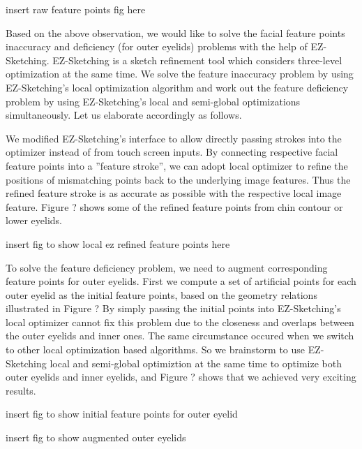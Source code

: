 		\begin{center}
				insert raw feature points fig here
		\end{center}
		
		Based on the above observation, we would like to solve the facial feature points inaccuracy and deficiency (for outer eyelids) problems with the help of EZ-Sketching. EZ-Sketching is a sketch refinement tool which considers three-level optimization at the same time. We solve the feature inaccuracy problem by using EZ-Sketching's local optimization algorithm and work out the feature deficiency problem by using EZ-Sketching's local and semi-global optimizations simultaneously. Let us elaborate accordingly as follows.
		
		We modified EZ-Sketching's interface to allow directly passing strokes into the optimizer instead of from touch screen inputs. By connecting respective facial feature points into a ''feature stroke'', we can adopt local optimizer to refine the positions of mismatching points back to the underlying image features. Thus the refined feature stroke is as accurate as possible with the respective local image feature. Figure ? shows some of the refined feature points from chin contour or lower eyelids.
		
		\begin{center}
				insert fig to show local ez refined feature points here
		\end{center}
		
		To solve the feature deficiency problem, we need to augment corresponding feature points for outer eyelids. First we compute a set of artificial points for each outer eyelid as the initial feature points, based on the geometry relations illustrated in Figure ? By simply passing the initial points into EZ-Sketching's local optimizer cannot fix this problem due to the closeness and overlaps between the outer eyelids and inner ones. The same circumstance occured when we switch to other local optimization based algorithms. So we brainstorm to use EZ-Sketching local and semi-global optimiztion at the same time to optimize both outer eyelids and inner eyelids, and Figure ? shows that we achieved very exciting results.
		
		\begin{center}
				insert fig to show initial feature points for outer eyelid
		\end{center}

		\begin{center}
				insert fig to show augmented outer eyelids
		\end{center}

